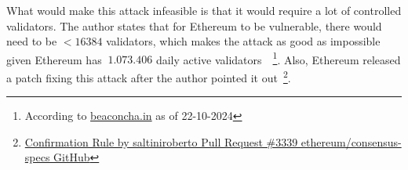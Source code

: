 What would make this attack infeasible is that it would require a lot of controlled validators.
The author states that for Ethereum to be vulnerable, there would need to be $<16384$ validators,
which makes the attack as good as impossible given Ethereum has $~1.073.406$ daily active validators~\cite{cryptoeprint:2023/1622}~\footnote{According to \href{https://beaconcha.in/charts/validators}{beaconcha.in} as of 22-10-2024}.
Also,
Ethereum released a patch
fixing this attack after the author pointed it out~\footnote{\href{https://github.com/ethereum/consensus-specs/pull/3339\#issuecomment-1637117341}{Confirmation Rule by saltiniroberto Pull Request \#3339 ethereum/consensus-specs GitHub}}.